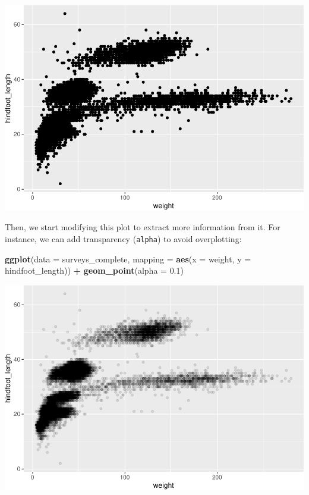\documentclass[]{book}
\newenvironment{Shaded}{\begin{snugshade}}{\end{snugshade}}
\newcommand{\KeywordTok}[1]{\textcolor[rgb]{0.13,0.29,0.53}{\textbf{#1}}}
\newcommand{\DataTypeTok}[1]{\textcolor[rgb]{0.13,0.29,0.53}{#1}}
\newcommand{\FloatTok}[1]{\textcolor[rgb]{0.00,0.00,0.81}{#1}}
\newcommand{\StringTok}[1]{\textcolor[rgb]{0.31,0.60,0.02}{#1}}
\newcommand{\OperatorTok}[1]{\textcolor[rgb]{0.81,0.36,0.00}{\textbf{#1}}}
\newcommand{\NormalTok}[1]{#1}
\begin{document}
\includegraphics{img/R-ecology-create-ggplot-object-1.pdf}

Then, we start modifying this plot to extract more information from it.
For instance, we can add transparency (\texttt{alpha}) to avoid
overplotting:

\begin{Shaded}
\begin{Highlighting}[]
\KeywordTok{ggplot}\NormalTok{(}\DataTypeTok{data =}\NormalTok{ surveys_complete, }\DataTypeTok{mapping =} \KeywordTok{aes}\NormalTok{(}\DataTypeTok{x =}\NormalTok{ weight, }\DataTypeTok{y =}\NormalTok{ hindfoot_length)) }\OperatorTok{+}
\StringTok{    }\KeywordTok{geom_point}\NormalTok{(}\DataTypeTok{alpha =} \FloatTok{0.1}\NormalTok{)}
\end{Highlighting}
\end{Shaded}

\includegraphics{img/R-ecology-adding-transparency-1.pdf}
\end{document}

